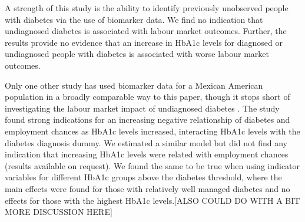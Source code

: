 A strength of this study is the ability to identify previously unobserved people with diabetes via the use of biomarker data. We find no indication that undiagnosed
diabetes is associated with labour market outcomes. Further, the results
provide no evidence that an increase in \ac{HbA1c} levels for diagnosed
or undiagnosed people with diabetes is associated with worse labour
market outcomes.

Only one other study has used biomarker data for a Mexican American
population in a broadly comparable way to this paper, though it stops short of investigating
the labour market impact of undiagnosed diabetes \citep{BrownIII2011}. The study found strong indications
for an increasing negative relationship of diabetes and employment
chances as \ac{HbA1c} levels increased, interacting \ac{HbA1c} levels
with the diabetes diagnosis dummy. We estimated a similar model but
did not find any indication that increasing \ac{HbA1c} levels were
related with employment chances (results available on request). We
found the same to be true when using indicator variables for different
\ac{HbA1c} groups above the diabetes threshold, where the main effects
were found for those with relatively well managed diabetes and no
effects for those with the highest \ac{HbA1c} levels.[ALSO COULD DO WITH A BIT MORE DISCUSSION HERE]

